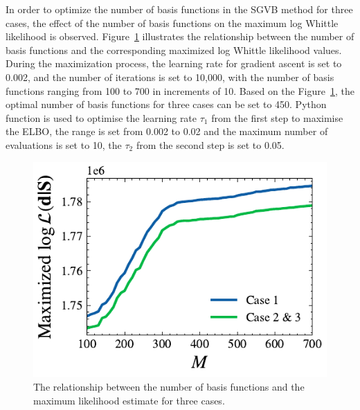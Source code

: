 \documentclass[%
 reprint,
 amsmath,amssymb,
 aps,
 nofootinbib,
]{revtex4-2}
\begin{document}
In order to optimize the number of basis functions in the \ac{SGVB} method for three cases, the effect of the number of basis functions on the maximum log Whittle likelihood is observed. Figure~\ref{et_corr_basis_funs_vs_mle} illustrates the relationship between the number of basis functions and the corresponding maximized log Whittle likelihood values. During the maximization process, the learning rate for gradient ascent is set to 0.002, and the number of iterations is set to 10,000, with the number of basis functions ranging from 100 to 700 in increments of 10. Based on the Figure~\ref{et_corr_basis_funs_vs_mle}, the optimal number of basis functions for three cases can be set to 450. Python function \hyperopt is used to optimise the learning rate $\tau_1$ from the first step to maximise the ELBO, the range is set from 0.002 to 0.02 and the maximum number of evaluations is set to 10, the $\tau_2$ from the second step is set to 0.05.
\begin{figure}
\centering
  \includegraphics[width=\columnwidth]{et_basis_fns.pdf}
  \caption{The relationship between the number of basis functions and the maximum likelihood estimate for three cases. }
  \label{et_corr_basis_funs_vs_mle}
\end{figure}




\end{document}

